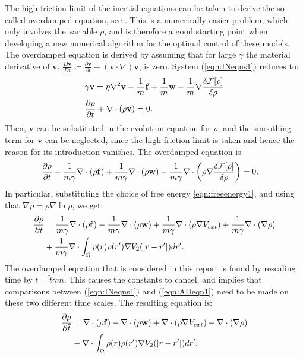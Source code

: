 \documentclass[11pt, a4paper]{article}
\theoremstyle{definition}
\newcommand{\Sta}{\rho}
\newcommand{\Stav}{\mathbf{v}}
\newcommand{\Con}{\mathbf{f}}
\begin{document}
The high friction limit of the inertial equations can be taken to derive the so-called overdamped equation, see \cite{Archer1}. This is a numerically easier problem, which only involves the variable $\rho$, and is therefore a good starting point when developing a new numerical algorithm for the optimal control of these models. 
The overdamped equation is derived by assuming that for large $\gamma$ the material derivative of $\Stav$, $\frac{D \Stav}{D t} \coloneqq  \frac{\partial \Stav}{\partial t} + (\Stav \cdot \nabla)\Stav$, is zero.
System (\ref{eqn:INeqns1}) reduces to:
 \begin{align*}
&\gamma \Stav=\eta \nabla^2 \Stav  -\frac{1}{m}\Con +\frac{1}{m}\mathbf{w} - \frac{1}{m}\nabla \frac{\delta \mathcal{F}[\Sta]}{\delta \Sta}\\
 &\frac{\partial \Sta}{\partial t} + \nabla \cdot (\Sta \Stav)=0 \notag.
 \end{align*}
Then, $\Stav$ can be substituted in the evolution equation for $\rho$, and the smoothing term for $\Stav$ can be neglected, since the high friction limit is taken and hence the reason for its introduction vanishes. The overdamped equation is:
  \begin{align*}
 &\frac{\partial \Sta}{\partial t} -\frac{1}{m \gamma}\nabla \cdot (\Sta\Con) +\frac{1}{m \gamma} \nabla \cdot (\Sta \mathbf{w}) - \frac{1}{m \gamma}\nabla \cdot \bigg(\Sta\nabla \frac{\delta \mathcal{F}[\Sta]}{\delta \Sta}\bigg)=0 \notag.
 \end{align*}
 In particular, substituting the choice of free energy \eqref{eqn:freeenergy1}, and using that $\nabla \rho = \rho\nabla \ln \rho$, we get:
\begin{align*}
\frac{\partial \Sta}{\partial t} &= \frac{1}{m \gamma}\nabla \cdot (\Sta\Con) -\frac{1}{m \gamma} \nabla \cdot (\Sta \mathbf{w})  + \frac{1}{m \gamma}\nabla \cdot (\rho\nabla V_{ext}) + \frac{1}{m \gamma}\nabla \cdot (\nabla \rho) \\
&+\frac{1}{m \gamma}\nabla \cdot \int_\Omega \Sta(r)\Sta(r') \nabla V_2(|r-r'|)dr'\notag.
\end{align*}
The overdamped equation that is considered in this report is found by rescaling time by $t = \tilde t \gamma m$. This causes the constants to cancel, and implies that comparisons between (\ref{eqn:INeqns1}) and (\ref{eqn:ADeqn1}) need to be made on these two different time scales.
The resulting equation is:
\begin{align}
\label{eqn:ADeqn1}
\frac{\partial \Sta}{\partial \tilde t} &= \nabla \cdot (\Sta\Con) - \nabla \cdot (\Sta \mathbf{w})  + \nabla \cdot (\rho\nabla V_{ext}) + \nabla \cdot (\nabla \rho) \\
&+\nabla \cdot \int_\Omega \Sta(r)\Sta(r') \nabla V_2(|r-r'|)dr'. \notag
\end{align}
\end{document}
